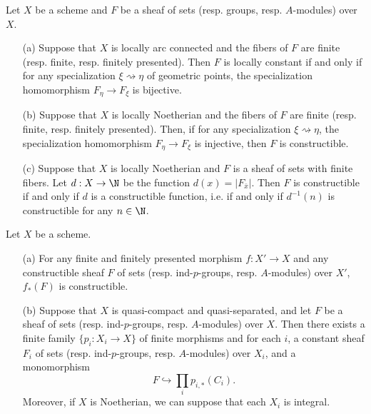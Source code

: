 \begin{proposition}\label{scheme etale sheaf constant constructible iff function}
Let $X$ be a scheme and $F$ be a sheaf of sets (resp. groups, resp. $A$-modules) over $X$.
\begin{enumerate}
    \item[(a)] Suppose that $X$ is locally arc connected and the fibers of $F$ are finite (resp. finite, resp. finitely presented). Then $F$ is locally constant if and only if for any specialization $\xi\rightsquigarrow\eta$ of geometric points, the specialization homomorphism $F_\eta\to F_\xi$ is bijective.
    \item[(b)] Suppose that $X$ is locally Noetherian and the fibers of $F$ are finite (resp. finite, resp. finitely presented). Then, if for any specialization $\xi\rightsquigarrow\eta$, the specialization homomorphism $F_\eta\to F_\xi$ is injective, then $F$ is constructible.
    \item[(c)] Suppose that $X$ is locally Noetherian and $F$ is a sheaf of sets with finite fibers. Let $d:X\to\N$ be the function $d(x)=|F_{\bar{x}}|$. Then $F$ is constructible if and only if $d$ is a constructible function, i.e. if and only if $d^{-1}(n)$ is constructible for any $n\in\N$.
\end{enumerate}
\end{proposition}

\begin{proposition}\label{scheme etale constructible iff embedded into direct image}
Let $X$ be a scheme.
\begin{enumerate}
    \item[(a)] For any finite and finitely presented morphism $f:X'\to X$ and any constructible sheaf $F$ of sets (resp. ind-$p$-groups, resp. $A$-modules) over $X'$, $f_*(F)$ is constructible.
    \item[(b)] Suppose that $X$ is quasi-compact and quasi-separated, and let $F$ be a sheaf of sets (resp. ind-$p$-groups, resp. $A$-modules) over $X$. Then there exists a finite family $\{p_i:X_i\to X\}$ of finite morphisms and for each $i$, a constant sheaf $F_i$ of sets (resp. ind-$p$-groups, resp. $A$-modules) over $X_i$, and a monomorphism
    \[F\hookrightarrow \prod_ip_{i,*}(C_i).\]
    Moreover, if $X$ is Noetherian, we can suppose that each $X_i$ is integral.
\end{enumerate}
\end{proposition}

